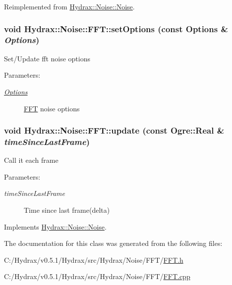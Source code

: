 Reimplemented from \hyperlink{class_hydrax_1_1_noise_1_1_noise_ac0a9fe1533ddd87467edb954f8abea8}{Hydrax::Noise::Noise}.\hypertarget{class_hydrax_1_1_noise_1_1_f_f_t_1d7ec06eb11cda608cc8f73256c35be5}{
\subsubsection[{setOptions}]{\setlength{\rightskip}{0pt plus 5cm}void Hydrax::Noise::FFT::setOptions (const {\bf Options} \& {\em Options})}}
\label{class_hydrax_1_1_noise_1_1_f_f_t_1d7ec06eb11cda608cc8f73256c35be5}


Set/Update fft noise options \begin{Desc}
\item[Parameters:]
\begin{description}
\item[{\em \hyperlink{struct_hydrax_1_1_noise_1_1_f_f_t_1_1_options}{Options}}]\hyperlink{class_hydrax_1_1_noise_1_1_f_f_t}{FFT} noise options \end{description}
\end{Desc}
\hypertarget{class_hydrax_1_1_noise_1_1_f_f_t_edb7b8614828cda29b62aa6c1509e22a}{
\subsubsection[{update}]{\setlength{\rightskip}{0pt plus 5cm}void Hydrax::Noise::FFT::update (const Ogre::Real \& {\em timeSinceLastFrame})}}
\label{class_hydrax_1_1_noise_1_1_f_f_t_edb7b8614828cda29b62aa6c1509e22a}


Call it each frame \begin{Desc}
\item[Parameters:]
\begin{description}
\item[{\em timeSinceLastFrame}]Time since last frame(delta) \end{description}
\end{Desc}


Implements \hyperlink{class_hydrax_1_1_noise_1_1_noise_9c32c4c630f193e034c074f69ea10f57}{Hydrax::Noise::Noise}.

The documentation for this class was generated from the following files:\begin{CompactItemize}
\item 
C:/Hydrax/v0.5.1/Hydrax/src/Hydrax/Noise/FFT/\hyperlink{_f_f_t_8h}{FFT.h}\item 
C:/Hydrax/v0.5.1/Hydrax/src/Hydrax/Noise/FFT/\hyperlink{_f_f_t_8cpp}{FFT.cpp}\end{CompactItemize}
